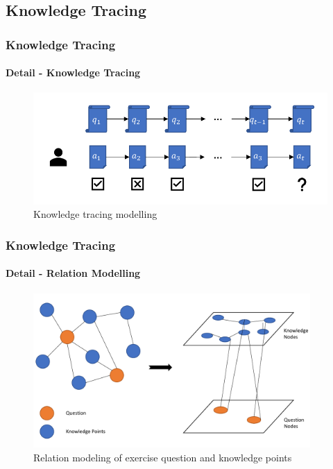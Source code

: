 \documentclass{beamer}
\begin{document}
\subsection{Knowledge Tracing}

\begin{frame}
  \frametitle{Knowledge Tracing}
  \framesubtitle{Detail - Knowledge Tracing}
  \begin{figure}
    \centering
    \includegraphics[width=1.0\textwidth]{figures/ch3-model-ktdes.pdf}
    \caption{Knowledge tracing modelling}
  \end{figure}
\end{frame}

\begin{frame}
  \frametitle{Knowledge Tracing}
  \framesubtitle{Detail - Relation Modelling}
  \begin{figure}
    \centering
    \includegraphics[width=0.94\textwidth]{figures/ch3-gat-kq.pdf}
    \caption{Relation modeling of exercise question and knowledge points}
  \end{figure}
\end{frame}
\end{document}
